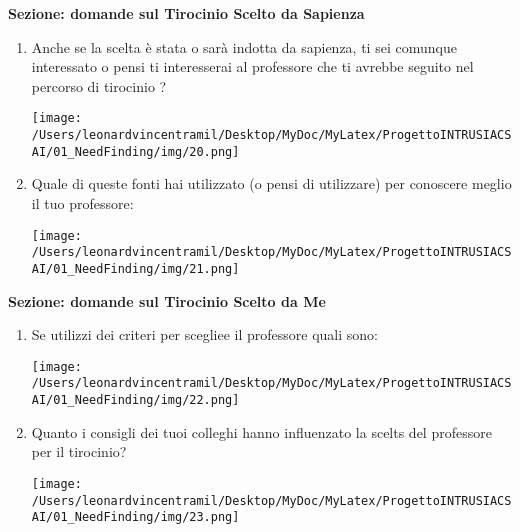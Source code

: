 \textbf{Sezione: domande sul Tirocinio Scelto da Sapienza}
\begin{enumerate}
    \item Anche se la scelta è stata o sarà indotta da sapienza, ti sei comunque interessato o pensi ti interesserai al professore che ti avrebbe seguito nel percorso di tirocinio ?
    \begin{center}
        \texttt{[image: /Users/leonardvincentramil/Desktop/MyDoc/MyLatex/ProgettoINTRUSIACSAI/01\_NeedFinding/img/20.png]}
    \end{center} 
    \item Quale di queste fonti hai utilizzato (o pensi di utilizzare) per conoscere meglio il tuo professore:
    \begin{center}
        \texttt{[image: /Users/leonardvincentramil/Desktop/MyDoc/MyLatex/ProgettoINTRUSIACSAI/01\_NeedFinding/img/21.png]}
    \end{center}
\end{enumerate}

\textbf{Sezione: domande sul Tirocinio Scelto da Me}
\begin{enumerate}
    \item Se utilizzi dei criteri per scegliee il professore quali sono:
    \begin{center}
        \texttt{[image: /Users/leonardvincentramil/Desktop/MyDoc/MyLatex/ProgettoINTRUSIACSAI/01\_NeedFinding/img/22.png]}
    \end{center}
    \item Quanto i consigli dei tuoi colleghi hanno influenzato la scelts del professore per il tirocinio?
    \begin{center}
        \texttt{[image: /Users/leonardvincentramil/Desktop/MyDoc/MyLatex/ProgettoINTRUSIACSAI/01\_NeedFinding/img/23.png]}
    \end{center}
\end{enumerate}

